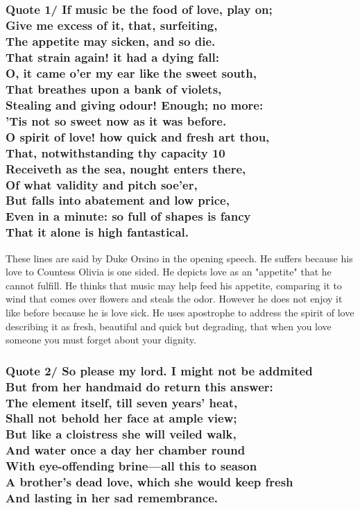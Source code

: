 \documentclass[12pt, a4paper]{article}
\begin{document}
\subsection*{}

\subsubsection*{Quote 1/
  If music be the food of love, play on;\\
	Give me excess of it, that, surfeiting,\\
	The appetite may sicken, and so die.\\
	That strain again! it had a dying fall:\\
	O, it came o'er my ear like the sweet south,\\
	That breathes upon a bank of violets,\\
	Stealing and giving odour! Enough; no more:\\
	'Tis not so sweet now as it was before.\\
	O spirit of love! how quick and fresh art thou,\\
	That, notwithstanding thy capacity	10\\
	Receiveth as the sea, nought enters there,\\
	Of what validity and pitch soe'er,\\
	But falls into abatement and low price,\\
	Even in a minute: so full of shapes is fancy\\
	That it alone is high fantastical.
}
These lines are said by Duke Orsino  in the opening speech. He suffers because
his love to Countess Olivia is one sided. He depicts love as an "appetite" that
he cannot fulfill. He thinks that music may help feed his appetite, comparing
it to wind that comes over flowers and steals the odor. However he does not
enjoy it like before because he is love sick. He uses apostrophe to address the spirit of love
describing it as fresh, beautiful and quick but degrading, that when you
love someone you must forget about your dignity.

\subsubsection*{Quote 2/ 
  So please my lord. I might not be addmited\\ 
  But from her handmaid do return this answer:\\
  The element itself, till seven years' heat, \\
  Shall not behold her face at ample view;\\ 
  But like a cloistress she will veiled walk,\\ 
  And water once a day her chamber round \\ 
  With eye-offending brine---all this to season\\
  A brother's dead love, which she would keep fresh\\
  And lasting in her sad remembrance.
}
\end{document}
